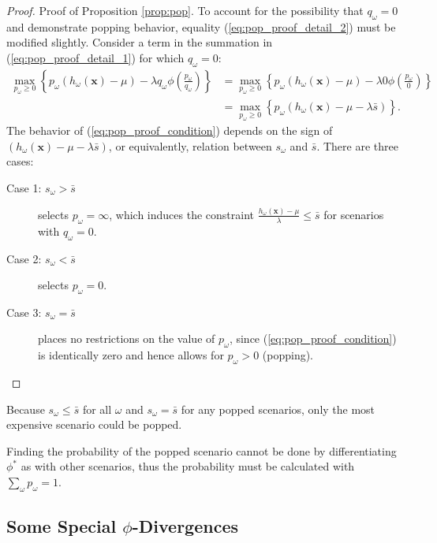 \documentclass[opre,nonblindrev]{informs3} %
\newcommand{\x}{\mathbf{x}}
\begin{document}
\begin{proof}{\sc Proof of Proposition \ref{prop:pop}.}
	To account for the possibility that $q_\omega = 0$ and demonstrate popping behavior, equality (\ref{eq:pop_proof_detail_2}) must be modified slightly.
	Consider a term in the summation in (\ref{eq:pop_proof_detail_1}) for which $q_\omega = 0$:
	\begin{align}
		\max_{p_\omega \geq 0} \left\{ p_\omega (h_\omega(\x) - \mu) - \lambda q_\omega  \phi\left(\frac{p_\omega}{q_\omega}\right) \right\} & = \max_{p_\omega \geq 0} \left\{ p_\omega (h_\omega(\x) - \mu) - \lambda 0  \phi\left(\frac{p_\omega}{0}\right) \right\} \nonumber \\
		& = \max_{p_\omega \geq 0} \left\{ p_\omega \left( h_\omega(\x) - \mu - \lambda \bar{s} \right) \right\}. \label{eq:pop_proof_condition}
	\end{align}
	The behavior of (\ref{eq:pop_proof_condition}) depends on the sign of $\left( h_\omega(\x) - \mu - \lambda \bar{s}  \right)$, or equivalently, relation between $s_\omega$ and $\bar{s}$.
	There are three cases:
	\begin{description}
		\item[Case 1: $s_\omega > \bar{s}$] selects $p_\omega = \infty$, which induces the constraint $\frac{h_\omega(\x) - \mu}{\lambda} \leq \bar{s}$ for scenarios with $q_\omega = 0$.
		\item[Case 2: $s_\omega < \bar{s}$] selects $p_\omega = 0$.
		\item[Case 3: $s_\omega = \bar{s}$] places no restrictions on the value of $p_\omega$, since (\ref{eq:pop_proof_condition}) is identically zero and hence allows for $p_\omega > 0$ (popping). \Halmos
	\end{description}
\end{proof}

\begin{remark}
	Because $s_\omega \leq \bar{s}$ for all $\omega$ and $s_\omega = \bar{s}$ for any popped scenarios, only the most expensive scenario could be popped.
\end{remark}

\begin{remark}
	Finding the probability of the popped scenario cannot be done by differentiating $\phi^*$ as with other scenarios, thus the probability must be calculated with $\sum_\omega p_\omega = 1$.
\end{remark}

\subsection{Some Special $\phi$-Divergences}
\label{ssec:special_phi}
\end{document}
